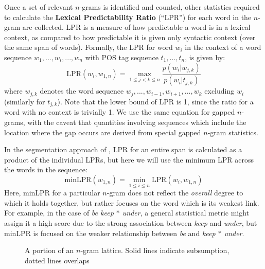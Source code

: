 \documentclass[11pt,letterpaper]{article}
\newcommand{\gap}{$*$\xspace}
\newcommand{\ex}[1]{\textit{#1}\xspace}
\newcommand{\termdef}[1]{\textbf{#1}\xspace}
\newcommand{\LPR}{\ensuremath{\text{LPR}}}
\newcommand{\minLPR}{\ensuremath{\text{minLPR}}}
\begin{document}
Once a set of relevant $n$-grams is identified and counted, other statistics required to calculate the \termdef{Lexical Predictability Ratio} (``LPR'') for each word in the $n$-gram are collected. LPR is a measure of how predictable a word is in a lexical context, as compared to how predictable it is given only syntactic context (over the same span of words). Formally, the LPR for word $w_i$ in the context of a word sequence $w_1,..., w_i, ..., w_{n}$ with POS tag sequence $t_1, ..., t_{n}$, is given by:
\begin{displaymath}
\LPR(w_i,w_{1,n}) = \max_{1 \leq j < k \leq n }{\frac{p(w_i|w_{j,k})}{p(w_i|t_{j,k})}}
\end{displaymath}
where $w_{j,k}$ denotes the word sequence $w_j,..., w_{i-1}, w_{i+1}, ..., w_{k}$ excluding $w_{i}$ (similarly for $t_{j,k}$). Note that the lower bound of LPR is 1, since the ratio for a word with no context is trivially 1. We use the same equation for gapped $n$-grams, with the caveat that quantities involving sequences which include the location where the gap occurs are derived from special gapped $n$-gram statistics. %


In the segmentation approach of , LPR for an entire span is calculated as a product of the individual LPRs, but here we will use the minimum LPR across the words in the sequence:
\begin{displaymath}
\minLPR(w_{1,n}) = \min_{1 \leq i \leq n }{\LPR(w_i,w_{1,n})}
\end{displaymath}
Here, minLPR for a particular $n$-gram does not reflect the \emph{overall} degree to which it holds together, but rather focuses on the word which is its weakest link. For example, in the case of \ex{be keep \gap under}, a general statistical metric might assign it a high score due to the strong association between \ex{keep} and \ex{under}, but minLPR is focused on the weaker relationship between \ex{be} and \ex{keep \gap under}.


\begin{figure}[!tb]
\caption{A portion of an $n$-gram lattice. Solid lines indicate subsumption, dotted lines overlaps}
\label{fig:example}
\end{figure}
\end{document}
